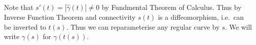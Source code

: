\documentclass[a4paper]{article}
\begin{document}
Note that \(s'(t) = |\hat \gamma(t)| \neq 0\) by Fundmental Theorem of Calculus. Thus by Inverse Function Theorem and connectivity \(s(t)\) is a diffeomorphism, i.e.\ can be inverted to \(t(s)\). Thus we can reparameterise any regular curve by \(s\). We will write \(\gamma(s)\) for \(\gamma(t(s))\).







\printindex

\iffalse
Classical differential geometry concerning geometries of curves and surfaces, from a modern point of view

Contents:
I: notions of smmoth \(k\)-dim manifolds. We study differential topology.

Geometry is concerned with the study of rigid motions

invariants of curves: \(k\) curvature, \(\tau\) torsion
invariant of surfaces: \(K\) mean curvature, \(K\) Gaussian curvature
\fi
\end{document}
